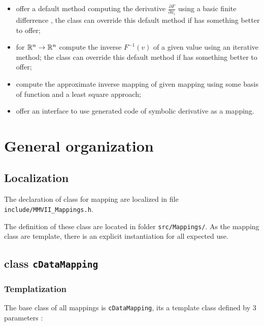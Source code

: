 \begin{itemize}
     \item offer a default method computing the derivative $\frac{\partial F}{\partial x_i}$  using a basic finite differrence ,
           the class can override this default method if has something better to offer;

   \item for $\mathbb{R}^n \rightarrow \mathbb{R}^n$ compute the inverse $F^{-1}(v)$ of a given  value using  an iterative method;
           the class can override this default method if has something better to offer;

   \item compute the approximate inverse mapping  of given mapping using some basis of function and a  least square approach;

   \item offer an interface to use generated code of symbolic derivative as a mapping.
\end{itemize}


\section{General organization}

\subsection{Localization}

The declaration of class for mapping are localized in file {\tt include/MMVII\_Mappings.h}.

The definition of these class are located in folder {\tt src/Mappings/}.
As the mapping class are template, there is an explicit instantiation  for
all expected use.



\subsection{class {\tt cDataMapping}}

\subsubsection{Templatization}
The base  class of all mappings is {\tt cDataMapping}, its a template class defined by $3$ 
parameters :

